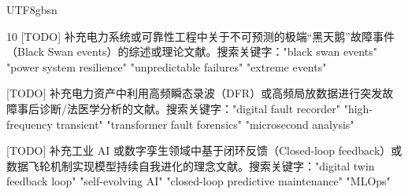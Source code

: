 \documentclass[journal]{IEEEtran}
\begin{document}
\begin{CJK*}{UTF8}{gbsn}
\begin{thebibliography}{10}
[TODO] 补充电力系统或可靠性工程中关于不可预测的极端“黑天鹅”故障事件（Black Swan events）的综述或理论文献。搜索关键字："black swan events" "power system resilience" "unpredictable failures" "extreme events"

[TODO] 补充电力资产中利用高频瞬态录波（DFR）或高频局放数据进行突发故障事后诊断/法医学分析的文献。搜索关键字："digital fault recorder" "high-frequency transient" "transformer fault forensics" "microsecond analysis"

[TODO] 补充工业 AI 或数字孪生领域中基于闭环反馈（Closed-loop feedback）或数据飞轮机制实现模型持续自我进化的理念文献。搜索关键字："digital twin feedback loop" "self-evolving AI" "closed-loop predictive maintenance" "MLOps"

\end{thebibliography}

\end{CJK*}
\end{document}
